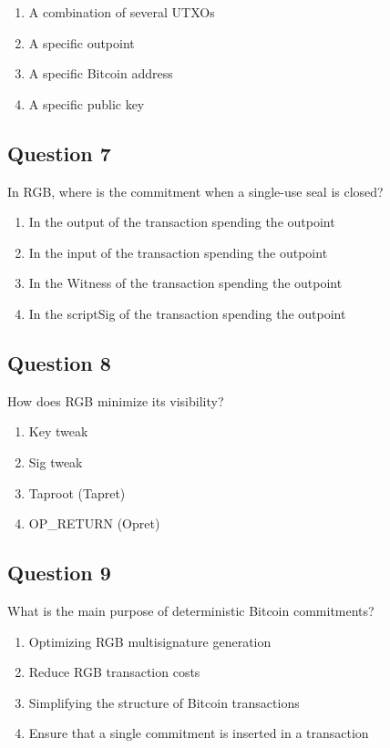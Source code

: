 \documentclass[12pt,a4paper]{article}
\begin{document}
\begin{enumerate}[label=\Alph*., leftmargin=*]
\item A combination of several UTXOs
\item A specific outpoint
\item A specific Bitcoin address
\item A specific public key
\end{enumerate}

\bigskip


\subsection*{Question 7}
In RGB, where is the commitment when a single-use seal is closed?

\begin{enumerate}[label=\Alph*., leftmargin=*]
\item In the output of the transaction spending the outpoint
\item In the input of the transaction spending the outpoint
\item In the Witness of the transaction spending the outpoint
\item In the scriptSig of the transaction spending the outpoint
\end{enumerate}

\bigskip


\subsection*{Question 8}
How does RGB minimize its visibility?

\begin{enumerate}[label=\Alph*., leftmargin=*]
\item Key tweak
\item Sig tweak
\item Taproot (Tapret)
\item OP\_RETURN (Opret)
\end{enumerate}

\bigskip


\subsection*{Question 9}
What is the main purpose of deterministic Bitcoin commitments?

\begin{enumerate}[label=\Alph*., leftmargin=*]
\item Optimizing RGB multisignature generation
\item Reduce RGB transaction costs
\item Simplifying the structure of Bitcoin transactions
\item Ensure that a single commitment is inserted in a transaction
\end{enumerate}
\end{document}

